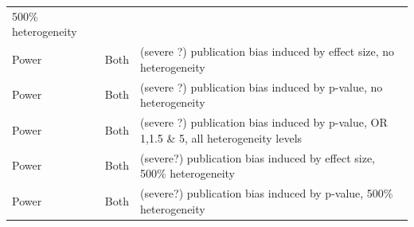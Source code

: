 \documentclass[
  english,
  doc,floatsintext,draftall]{apa6}
\begin{document}
\begin{longtable}[]{@{}lll@{}}
\begin{minipage}[t]{0.30\columnwidth}
500\% heterogeneity\strut
\end{minipage}\tabularnewline
\begin{minipage}[t]{0.30\columnwidth}\raggedright
Power\strut
\end{minipage} & \begin{minipage}[t]{0.30\columnwidth}\raggedright
Both\strut
\end{minipage} & \begin{minipage}[t]{0.30\columnwidth}\raggedright
(severe ?) publication bias induced by effect size, no heterogeneity\strut
\end{minipage}\tabularnewline
\begin{minipage}[t]{0.30\columnwidth}\raggedright
Power\strut
\end{minipage} & \begin{minipage}[t]{0.30\columnwidth}\raggedright
Both\strut
\end{minipage} & \begin{minipage}[t]{0.30\columnwidth}\raggedright
(severe ?) publication bias induced by p-value, no heterogeneity\strut
\end{minipage}\tabularnewline
\begin{minipage}[t]{0.30\columnwidth}\raggedright
Power\strut
\end{minipage} & \begin{minipage}[t]{0.30\columnwidth}\raggedright
Both\strut
\end{minipage} & \begin{minipage}[t]{0.30\columnwidth}\raggedright
(severe ?) publication bias induced by p-value, OR 1,1.5 \& 5, all heterogeneity levels\strut
\end{minipage}\tabularnewline
\begin{minipage}[t]{0.30\columnwidth}\raggedright
Power\strut
\end{minipage} & \begin{minipage}[t]{0.30\columnwidth}\raggedright
Both\strut
\end{minipage} & \begin{minipage}[t]{0.30\columnwidth}\raggedright
(severe?) publication bias induced by effect size, 500\% heterogeneity\strut
\end{minipage}\tabularnewline
\begin{minipage}[t]{0.30\columnwidth}\raggedright
Power\strut
\end{minipage} & \begin{minipage}[t]{0.30\columnwidth}\raggedright
Both\strut
\end{minipage} & \begin{minipage}[t]{0.30\columnwidth}\raggedright
(severe?) publication bias induced by p-value, 500\% heterogeneity\strut
\end{minipage}\tabularnewline
\bottomrule
\end{longtable}
\end{document}
